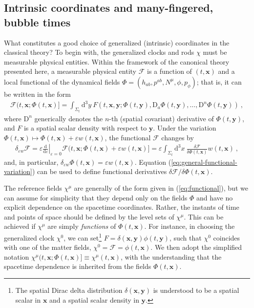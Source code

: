 \documentclass[12pt]{iopart}
\def\eq#1{\begin{equation}\begin{aligned}#1\end{aligned}\end{equation}}
\def\eref#1{(\ref{eq:#1})}
\def\D{\mathrm{d}}
\def\Del#1#2{\frac{\D#1}{\D#2}}
\def\x{\mathbf{x}}
\def\y{\mathbf{y}}
\begin{document}
\subsection{Intrinsic coordinates and many-fingered, bubble times}
What constitutes a good choice of generalized (intrinsic) coordinates in the classical theory? To begin with, the generalized clocks and rods $\chi$ must be measurable physical entities. Within the framework of the canonical theory presented here, a measurable physical entity $\mathcal{F}$ is a function of $(t,\x)$ and a local functional of the dynamical fields $\Phi = (h_{ab}, p^{ab},N^{\mu},\phi,p_{\phi})$; that is, it can be written in the form
\eq{\label{eq:functional}
\mathcal{F}(t,\x;\Phi(t,\x)] = \int_{\Sigma_t}\D^3 y\ F\left(t,\x,\y;\Phi(t,\y), \mathrm{D}_a\Phi(t,\y),\ldots,\mathrm{D}^n\Phi(t,\y)\right) \ , 
}
where $\mathrm{D}^n$ generically denotes the $n$-th (spatial covariant) derivative of $\Phi(t,\y)$, and $F$ is a spatial scalar density with respect to $\y$. Under the variation $\Phi(t,\x)\mapsto\Phi(t,\x)+\varepsilon w(t,\x)$, the functional $\mathcal{F}$ changes by
\eq{\label{eq:general-functional-variation}
\delta_{\varepsilon w} \mathcal{F} = \varepsilon\left.\Del{}{\varepsilon}\right|_{\varepsilon=0}\mathcal{F}(t,\x;\Phi(t,\x)+\varepsilon w(t,\x)] = \varepsilon\int_{\Sigma_t}\D^3x\ \frac{\delta \mathcal{F}}{\delta\Phi(t,\x)}w(t,\x) \ ,
}
and, in particular, $\delta_{\varepsilon w}\Phi(t,\x) = \varepsilon w(t,\x)$. Equation \eref{general-functional-variation} can be used to define functional derivatives $\delta\mathcal{F}/\delta\Phi(t,\x)$.

The reference fields $\chi^{\mu}$ are generally of the form given in \eref{functional}, but we can assume for simplicity that they depend only on the fields $\Phi$ and have no explicit dependence on the spacetime coordinates. Rather, the instants of time and points of space should be defined by the level sets of $\chi^{\mu}$. This can be achieved if $\chi^{\mu}$ are simply \emph{functions} of $\Phi(t,\x)$. For instance, in choosing the generalized clock $\chi^0$, we can set\footnote{\label{foot:delta-density}The spatial Dirac delta distribution $\delta(\x,\y)$ is understood to be a spatial scalar in $\x$ and a spatial scalar density in $\y$.} $F = \delta(\x,\y)\phi(t,\y)$, such that $\chi^0$ coincides with one of the matter fields, $\chi^0 = \mathcal{F} = \phi(t,\x)$. We then adopt the simplified notation $\chi^{\mu}(t,\x;\Phi(t,\x)]\equiv\chi^{\mu}(t,\x)$, with the understanding that the spacetime dependence is inherited from the fields $\Phi(t,\x)$.
\end{document}
